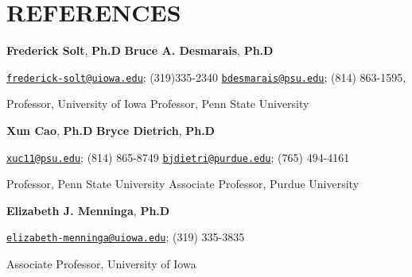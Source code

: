 \documentclass[10.5pt,]{article}
\providecommand{\tightlist}{%
	\setlength{\itemsep}{0pt}\setlength{\parskip}{0pt}}
\renewenvironment{itemize}{
	\begin{list}{}{
			\setlength{\leftmargin}{1.5em}
		}
	}{
	\end{list}
}
\begin{document}
\section{REFERENCES}\label{references}

\begin{itemize}
\tightlist
\item
  \textbf{Frederick Solt}, \textbf{Ph.D} \hfill \textbf{Bruce A.
  Desmarais}, \textbf{Ph.D}
\item
  \href{mailto:frederick-solt@uiowa.edu}{\nolinkurl{frederick-solt@uiowa.edu}};
  (319)335-2340
  \hfill  \href{mailto:bdesmarais@psu.edu}{\nolinkurl{bdesmarais@psu.edu}};
  (814) 863-1595,
\item
  Professor, University of Iowa \hfill  Professor, Penn State University
\item
  \textbf{Xun Cao}, \textbf{Ph.D} \hfill \textbf{Bryce Dietrich},
  \textbf{Ph.D}
\item
  \href{mailto:xuc11@psu.edu}{\nolinkurl{xuc11@psu.edu}}; (814) 865-8749
  \hfill  \href{mailto:bjdietri@purdue.edu}{\nolinkurl{bjdietri@purdue.edu}};
  (765) 494-4161
\item
  Professor, Penn State University \hfill Associate Professor, Purdue
  University
\item
  \textbf{Elizabeth J. Menninga}, \textbf{Ph.D}
\item
  \href{mailto:elizabeth-menninga@uiowa.edu}{\nolinkurl{elizabeth-menninga@uiowa.edu}};
  (319) 335-3835
\item
  Associate Professor, University of Iowa
\end{itemize}
	
			
\end{document}
